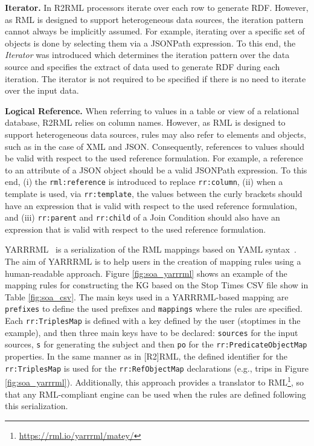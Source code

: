 \noindent\textbf{{Iterator.}} In R2RML processors iterate over each row to generate RDF. However, as RML is designed to support heterogeneous data sources, the iteration pattern cannot always be implicitly assumed. For example, iterating over a specific set of objects is done by selecting them via a JSONPath expression. To this end, the \emph{Iterator} was introduced which determines the iteration pattern over the data source and specifies the extract of data used to generate RDF during each iteration. The iterator is not required to be specified if there is no need to iterate over the input data.

\noindent\textbf{{Logical Reference.}} When referring to values in a table or view of a relational database, R2RML relies on column names. However, as RML is designed to support heterogeneous data sources, rules may also refer to elements and objects, such as in the case of XML and JSON. Consequently, references to values should be valid with respect to the used reference formulation. For example, a reference to an attribute of a JSON object should be a valid JSONPath expression. To this end, (i) the \verb|rml:reference| is introduced to replace \verb|rr:column|, (ii) when a template is used, via \verb|rr:template|, the values between the curly brackets should have an expression that is valid with respect to the used reference formulation, and (iii) \verb|rr:parent| and \verb|rr:child| of a Join Condition should also have an expression that is valid with respect to the used reference formulation.


YARRRML~\citep{Heyvaert2018Declarative} is a serialization of the RML mappings based on YAML syntax~\citep{ben2001yaml}. The aim of YARRRML is to help users in the creation of mapping rules using a human-readable approach. Figure \ref{fig:soa_yarrrml} shows an example of the mapping rules for constructing the KG based on the Stop Times CSV file show in Table \ref{fig:soa_csv}. The main keys used in a YARRRML-based mapping are \texttt{prefixes} to define the used prefixes and \texttt{mappings} where the rules are specified. Each \texttt{rr:TriplesMap} is defined with a key defined by the user (stoptimes in the example), and then three main keys have to be declared: \texttt{sources} for the input sources, \texttt{s} for generating the subject and then \texttt{po} for the \texttt{rr:PredicateObjectMap} properties. In the same manner as in [R2]RML, the defined identifier for the \texttt{rr:TriplesMap} is used for the \texttt{rr:RefObjectMap} declarations (e.g., trips in Figure \ref{fig:soa_yarrrml}). Additionally, this approach provides a translator to RML\footnote{\url{https://rml.io/yarrrml/matey/}}, so that any RML-compliant engine can be used when the rules are defined following this serialization.




